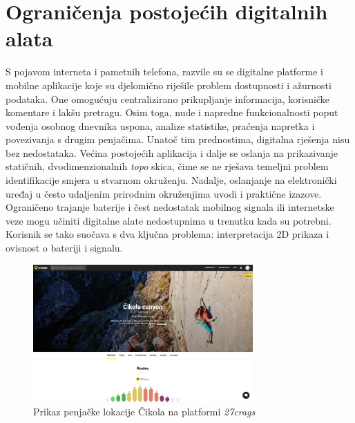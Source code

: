 \section{Ograničenja postojećih digitalnih alata}

S pojavom interneta i pametnih telefona, razvile su se digitalne platforme i mobilne aplikacije koje su djelomično riješile problem dostupnosti i ažurnosti podataka. One omogućuju centralizirano prikupljanje informacija, korisničke komentare i lakšu pretragu. Osim toga, nude i napredne funkcionalnosti poput vođenja osobnog dnevnika uspona, analize statistike, praćenja napretka i povezivanja s drugim penjačima.
Unatoč tim prednostima, digitalna rješenja nisu bez nedostataka. Većina postojećih aplikacija i dalje se oslanja na prikazivanje statičnih, dvodimenzionalnih \textit{topo} skica, čime se ne rješava temeljni problem identifikacije smjera u stvarnom okruženju. Nadalje, oslanjanje na elektronički uređaj u često udaljenim prirodnim okruženjima uvodi i praktične izazove. Ograničeno trajanje baterije i čest nedostatak mobilnog signala ili internetske veze mogu učiniti digitalne alate nedostupnima u trenutku kada su potrebni. Korisnik se tako suočava s dva ključna problema: interpretacija 2D prikaza i ovisnost o bateriji i signalu.

\begin{figure}[H]
    \centering
    \includegraphics[width=0.75\textwidth]{images/uvod/27crags_cikola.jpeg}
    \caption{Prikaz penjačke lokacije Čikola na platformi \textit{27crags}}
\end{figure}

